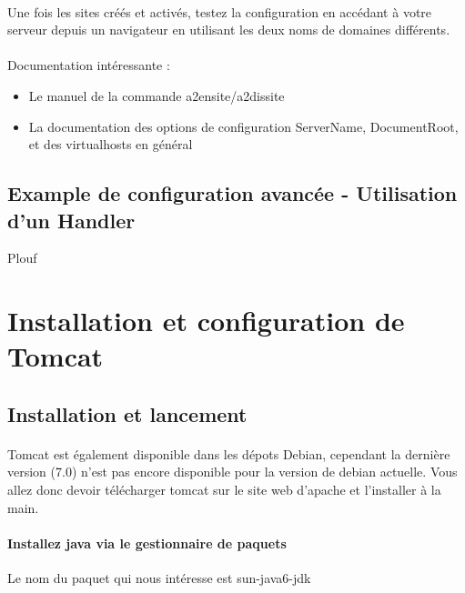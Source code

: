 \documentclass[12pt,a4paper]{article}
\begin{document}
\begin{itemize}
\paragraph{}
Une fois les sites créés et activés, testez la configuration en accédant à votre serveur depuis un navigateur en utilisant les deux noms de domaines différents.

\paragraph{}
Documentation intéressante : 
\begin{itemize}
\item Le manuel de la commande a2ensite/a2dissite
\item La documentation des options de configuration ServerName, DocumentRoot, et des virtualhosts en général
\end{itemize}

\subsection{Example de configuration avancée - Utilisation d'un Handler}
Plouf

\section{Installation et configuration de Tomcat}

\subsection{Installation et lancement}

\paragraph{}
Tomcat est également disponible dans les dépots Debian, cependant la dernière version (7.0) n'est pas encore disponible pour la version de debian actuelle. Vous allez donc devoir télécharger tomcat sur le site web d'apache et l'installer à la main.

\paragraph{Installez java via le gestionnaire de paquets\\}
Le nom du paquet qui nous intéresse est sun-java6-jdk


\end{itemize}
\end{document}
